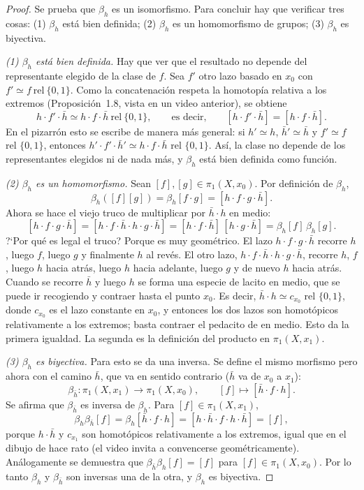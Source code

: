 \documentclass[11pt]{article}
\begin{document}
\begin{proof}
Se prueba que $\beta_h$ es un isomorfismo. Para concluir hay que verificar tres cosas: (1) $\beta_h$ está bien definida; (2) $\beta_h$ es un homomorfismo de grupos; (3) $\beta_h$ es biyectiva.

\medskip\noindent\textit{(1) $\beta_h$ está bien definida.}
Hay que ver que el resultado no depende del representante elegido de la clase de $f$. Sea $f'$ otro lazo basado en $x_0$ con $f'\simeq f\ \mathrm{rel}\ \{0,1\}$. Como la concatenación respeta la homotopía relativa a los extremos (Proposición~1.8, vista en un video anterior), se obtiene
\[
  h\cdot f'\cdot\bar h\simeq h\cdot f\cdot\bar h\ \mathrm{rel}\ \{0,1\},
  \qquad\text{es decir,}\qquad
  [h\cdot f'\cdot\bar h]=[h\cdot f\cdot\bar h].
\]
En el pizarrón esto se escribe de manera más general: si $h'\simeq h$, $\bar h'\simeq\bar h$ y $f'\simeq f$ rel $\{0,1\}$, entonces $h'\cdot f'\cdot\bar h'\simeq h\cdot f\cdot\bar h$ rel $\{0,1\}$. Así, la clase no depende de los representantes elegidos ni de nada más, y $\beta_h$ está bien definida como función.

\medskip\noindent\textit{(2) $\beta_h$ es un homomorfismo.}
Sean $[f],[g]\in\pi_1(X,x_0)$. Por definición de $\beta_h$,
\[
  \beta_h([f][g])=\beta_h[f\cdot g]=[h\cdot f\cdot g\cdot\bar h].
\]
Ahora se hace el viejo truco de multiplicar por $\bar h\cdot h$ en medio:
\[
  [h\cdot f\cdot g\cdot\bar h]
  =[h\cdot f\cdot\bar h\cdot h\cdot g\cdot\bar h]
  =[h\cdot f\cdot\bar h]\,[h\cdot g\cdot\bar h]
  =\beta_h[f]\,\beta_h[g].
\]
?`Por qué es legal el truco? Porque es muy geométrico. El lazo $h\cdot f\cdot g\cdot\bar h$ recorre $h$, luego $f$, luego $g$ y finalmente $h$ al revés. El otro lazo, $h\cdot f\cdot\bar h\cdot h\cdot g\cdot\bar h$, recorre $h$, $f$, luego $h$ hacia atrás, luego $h$ hacia adelante, luego $g$ y de nuevo $h$ hacia atrás. Cuando se recorre $\bar h$ y luego $h$ se forma una especie de lacito en medio, que se puede ir recogiendo y contraer hasta el punto $x_0$. Es decir, $\bar h\cdot h\simeq c_{x_0}$ rel $\{0,1\}$, donde $c_{x_0}$ es el lazo constante en $x_0$, y entonces los dos lazos son homotópicos relativamente a los extremos; basta contraer el pedacito de en medio. Esto da la primera igualdad. La segunda es la definición del producto en $\pi_1(X,x_1)$.

\medskip\noindent\textit{(3) $\beta_h$ es biyectiva.}
Para esto se da una inversa. Se define el mismo morfismo pero ahora con el camino $\bar h$, que va en sentido contrario ($\bar h$ va de $x_0$ a $x_1$):
\[
  \beta_{\bar h}\colon\pi_1(X,x_1)\longrightarrow\pi_1(X,x_0),
  \qquad
  [f]\longmapsto[\bar h\cdot f\cdot h].
\]
Se afirma que $\beta_{\bar h}$ es inversa de $\beta_h$. Para $[f]\in\pi_1(X,x_1)$,
\[
  \beta_h\beta_{\bar h}[f]
  =\beta_h[\bar h\cdot f\cdot h]
  =[h\cdot\bar h\cdot f\cdot h\cdot\bar h]
  =[f],
\]
porque $h\cdot\bar h$ y $c_{x_1}$ son homotópicos relativamente a los extremos, igual que en el dibujo de hace rato (el video invita a convencerse geométricamente). Análogamente se demuestra que $\beta_{\bar h}\beta_h[f]=[f]$ para $[f]\in\pi_1(X,x_0)$. Por lo tanto $\beta_h$ y $\beta_{\bar h}$ son inversas una de la otra, y $\beta_h$ es biyectiva.


\end{proof}
\end{document}
